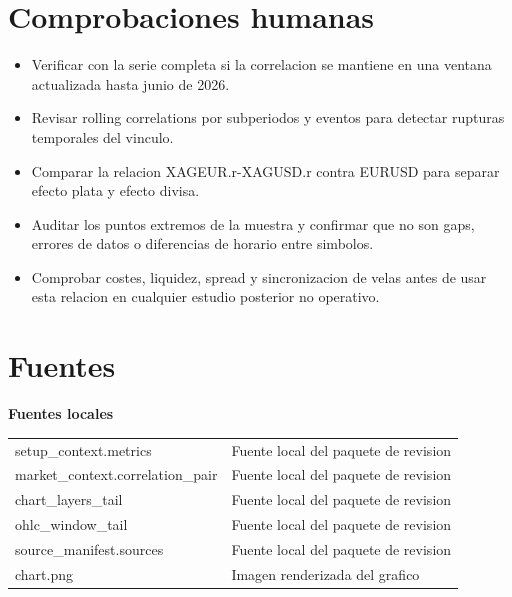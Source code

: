 \documentclass[11pt,a4paper]{article}
\begin{document}
\section*{Comprobaciones humanas}
\begin{itemize}
  \item Verificar con la serie completa si la correlacion se mantiene en una ventana actualizada hasta junio de 2026.
  \item Revisar rolling correlations por subperiodos y eventos para detectar rupturas temporales del vinculo.
  \item Comparar la relacion XAGEUR.r-XAGUSD.r contra EURUSD para separar efecto plata y efecto divisa.
  \item Auditar los puntos extremos de la muestra y confirmar que no son gaps, errores de datos o diferencias de horario entre simbolos.
  \item Comprobar costes, liquidez, spread y sincronizacion de velas antes de usar esta relacion en cualquier estudio posterior no operativo.
\end{itemize}

\section*{Fuentes}
\textbf{Fuentes locales}\par
\begin{tabularx}{\textwidth}{p{4.2cm}X}
setup\_context.metrics & Fuente local del paquete de revision \\
market\_context.correlation\_pair & Fuente local del paquete de revision \\
chart\_layers\_tail & Fuente local del paquete de revision \\
ohlc\_window\_tail & Fuente local del paquete de revision \\
source\_manifest.sources & Fuente local del paquete de revision \\
chart.png & Imagen renderizada del grafico \\
\end{tabularx}
\end{document}
